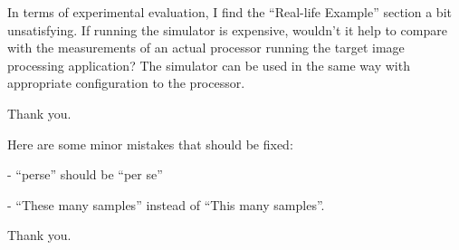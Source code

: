 \begin{reviewer}
In terms of experimental evaluation, I find the ``Real-life Example'' section a
bit unsatisfying. If running the simulator is expensive, wouldn't it help to
compare with the measurements of an actual processor running the target image
processing application? The simulator can be used in the same way with
appropriate configuration to the processor.
\end{reviewer}

\begin{authors}
Thank you.
\end{authors}

\begin{reviewer}
Here are some minor mistakes that should be fixed:

\noindent- ``perse'' should be ``per se''

\noindent- ``These many samples'' instead of ``This many samples''.
\end{reviewer}

\begin{authors}
Thank you.
\end{authors}
